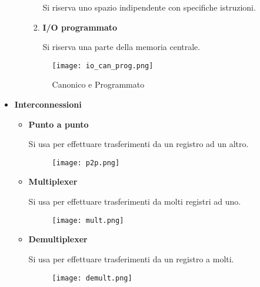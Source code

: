 \documentclass{article}
\begin{document}
\begin{itemize}
\begin{itemize}
\begin{enumerate}
                    Si riserva uno spazio indipendente con specifiche istruzioni.

                \item \textbf{I/O programmato}

                    Si riserva una parte della memoria centrale.
                
            \end{enumerate}

        \begin{figure}[ht]
        \centering
        \texttt{[image: io\_can\_prog.png]}
        \label{fig:io}
        \caption{Canonico e Programmato}
        \end{figure}
        
    \end{itemize}

    \newpage

    \item \textbf{Interconnessioni}
        \begin{itemize}
            \item \textbf{Punto a punto}
        
                Si usa per effettuare trasferimenti da un registro ad un altro.

                        \begin{figure}[ht]
                        \centering
                        \texttt{[image: p2p.png]}
                        \label{fig:p2p}
                        \end{figure}

            \item \textbf{Multiplexer}

                Si usa per effettuare trasferimenti da molti registri ad uno.

                        \begin{figure}[ht]
                        \centering
                        \texttt{[image: mult.png]}
                        \label{fig:mult}
                        \end{figure}

            \item \textbf{Demultiplexer}

                Si usa per effettuare trasferimenti da un registro a molti.

                        \begin{figure}[ht]
                        \centering
                        \texttt{[image: demult.png]}
                        \label{fig:demult}
                        \end{figure}


\end{itemize}
\end{itemize}
\end{document}
